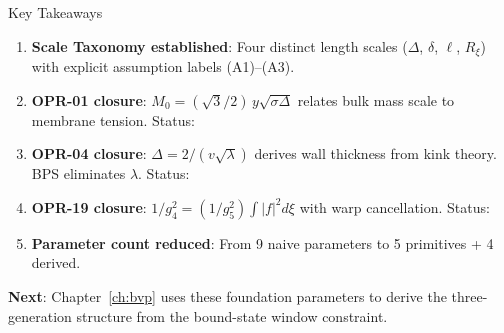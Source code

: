 \begin{statusbox}{Key Takeaways}
\begin{enumerate}
\item \textbf{Scale Taxonomy established}: Four distinct length scales ($\Delta$,
      $\delta$, $\ell$, $R_\xi$) with explicit assumption labels (A1)--(A3).

\item \textbf{OPR-01 closure}: $M_0 = (\sqrt{3}/2)\,y\sqrt{\sigma\Delta}$ relates
      bulk mass scale to membrane tension. Status: \tagDc{}

\item \textbf{OPR-04 closure}: $\Delta = 2/(v\sqrt{\lambda})$ derives wall thickness
      from kink theory. BPS eliminates $\lambda$. Status: \tagDc{}

\item \textbf{OPR-19 closure}: $1/g_4^2 = (1/g_5^2)\int|f|^2 d\xi$ with warp
      cancellation. Status: \tagDc{}

\item \textbf{Parameter count reduced}: From 9 naive parameters to 5 primitives + 4 derived.
\end{enumerate}
\end{statusbox}

\textbf{Next}: Chapter~\ref{ch:bvp} uses these foundation parameters to
derive the three-generation structure from the bound-state window constraint.

